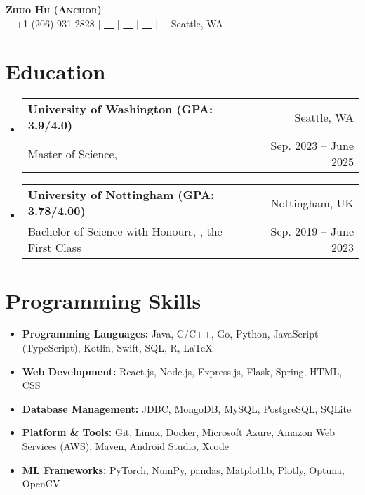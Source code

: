 \documentclass[letterpaper,10pt]{article}
\makeatletter
\newcommand{\link}[1]{\color{myBlue}{#1}}
\newcommand{\resumeSubheading}[4]{
  \vspace{-2pt}\item
    \begin{tabular*}{0.97\textwidth}[t]{l@{\extracolsep{\fill}}r}
      \textbf{#1} & #2 \\
      \small#3 & \small #4 \\
    \end{tabular*}\vspace{-7pt}
}
\newcommand{\resumeSubHeadingListStart}{\begin{itemize}[leftmargin=0.15in, label={}]}
\newcommand{\resumeSubHeadingListEnd}{\end{itemize}}
\makeatother
\begin{document}
\begin{center}
  \textbf{\Huge \scshape Zhuo Hu (Anchor)} \\ \vspace{1pt}
  \small \faMobile \ \ +1 (206) 931-2828 $|$ \href{mailto:uwzhuohu@uw.edu}{\faEnvelope \ \ \link{uwzhuohu@uw.edu}} $|$
  \href{https://linkedin.com/in/zhuo-hu}{\faLinkedin \ \ \link{LinkedIn}} $|$
  \href{https://github.com/Anchor-ZhuoHU}{\faGithub \ \ \link{GitHub}} $|$
  \faBuilding \ \ Seattle, WA
\end{center}
\section{Education}
\resumeSubHeadingListStart
\resumeSubheading
{University of Washington (GPA: 3.9/4.0)}{Seattle, WA}
{Master of Science, \href{https://www.ece.uw.edu/}{\link{Electrical and Computer Engineering}}}{Sep. 2023 -- June 2025}
\resumeSubheading
{University of Nottingham (GPA: 3.78/4.00)}{Nottingham, UK}
{Bachelor of Science with Honours, \href{https://www.nottingham.ac.uk/mathematics/}{\link{Mathematics with Applied Mathematics}}, the First Class}{Sep. 2019 -- June 2023}
\resumeSubHeadingListEnd
\section{Programming Skills}
\resumeSubHeadingListStart
\setlength\itemsep{0em}
\item \textbf{Programming Languages:} Java, C/C++, Go, Python, JavaScript (TypeScript), Kotlin, Swift, SQL, R, \LaTeX
\item \textbf{Web Development:} React.js, Node.js, Express.js, Flask, Spring, HTML, CSS
\item \textbf{Database Management:} JDBC, MongoDB, MySQL, PostgreSQL, SQLite
\item \textbf{Platform \& Tools:} Git, Linux, Docker, Microsoft Azure, Amazon Web Services (AWS), Maven, Android Studio, Xcode
\item \textbf{ML Frameworks:} PyTorch, NumPy, pandas, Matplotlib, Plotly, Optuna, OpenCV
\vspace{-8pt}
\resumeSubHeadingListEnd
\end{document}

